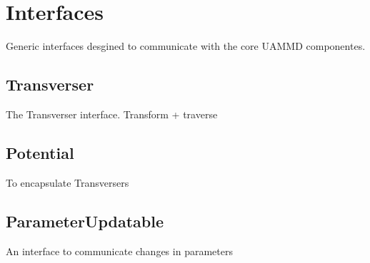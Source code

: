 \chapter{Interfaces}\label{ch:interfaces}
Generic interfaces desgined to communicate with the core \gls{UAMMD} componentes.
\section{Transverser}
The Transverser interface. Transform + traverse
\section{Potential}
To encapsulate Transversers
\section{ParameterUpdatable}
An interface to communicate changes in parameters



